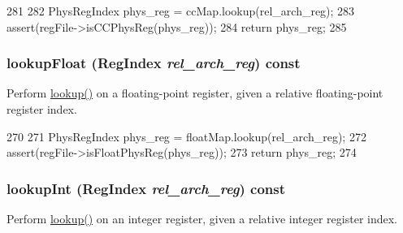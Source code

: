 \begin{DoxyCode}
281     {
282         PhysRegIndex phys_reg = ccMap.lookup(rel_arch_reg);
283         assert(regFile->isCCPhysReg(phys_reg));
284         return phys_reg;
285     }
\end{DoxyCode}
\hypertarget{classUnifiedRenameMap_a356c0162075adeb1426a1f237da3825e}{
\subsubsection[{lookupFloat}]{ lookupFloat ({\bf RegIndex} {\em rel\_\-arch\_\-reg}) const}}
\label{classUnifiedRenameMap_a356c0162075adeb1426a1f237da3825e}
Perform \hyperlink{classUnifiedRenameMap_a149269d2ce2fbf7e13ec91a5647bf170}{lookup()} on a floating-\/point register, given a relative floating-\/point register index. 


\begin{DoxyCode}
270     {
271         PhysRegIndex phys_reg = floatMap.lookup(rel_arch_reg);
272         assert(regFile->isFloatPhysReg(phys_reg));
273         return phys_reg;
274     }
\end{DoxyCode}
\hypertarget{classUnifiedRenameMap_af15380c4147afeea6a1d9675a7210244}{
\subsubsection[{lookupInt}]{ lookupInt ({\bf RegIndex} {\em rel\_\-arch\_\-reg}) const}}
\label{classUnifiedRenameMap_af15380c4147afeea6a1d9675a7210244}
Perform \hyperlink{classUnifiedRenameMap_a149269d2ce2fbf7e13ec91a5647bf170}{lookup()} on an integer register, given a relative integer register index. 


